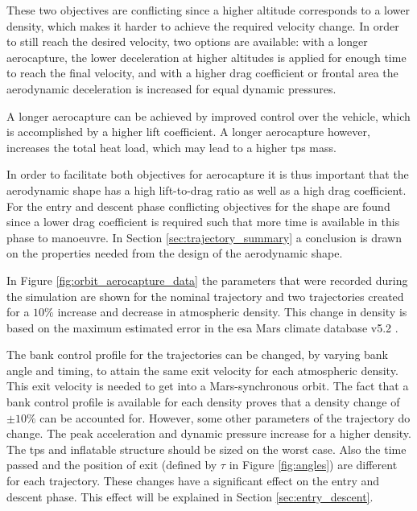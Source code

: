 These two objectives are conflicting since a higher altitude corresponds to a lower density, which makes it harder to achieve the required velocity change. In order to still reach the desired velocity, two options are available: with a longer aerocapture, the lower deceleration at higher altitudes is applied for enough time to reach the final velocity, and with a higher drag coefficient or frontal area the aerodynamic deceleration is increased for equal dynamic pressures.

A longer aerocapture can be achieved by improved control over the vehicle, which is accomplished by a higher lift coefficient. A longer aerocapture however, increases the total heat load, which may lead to a higher \gls{tps} mass.

In order to facilitate both objectives for aerocapture it is thus important that the aerodynamic shape has a high lift-to-drag ratio as well as a high drag coefficient. For the entry and descent phase conflicting objectives for the shape are found since a lower drag coefficient is required such that more time is available in this phase to manoeuvre. In Section \ref{sec:trajectory_summary} a conclusion is drawn on the properties needed from the design of the aerodynamic shape.

In Figure \ref{fig:orbit_aerocapture_data} the parameters that were recorded during the simulation are shown for the nominal trajectory and two trajectories created for a $10\%$ increase and decrease in atmospheric density. This change in density is based on the maximum estimated error in the \gls{esa} Mars climate database v5.2 \cite{Lewis2015}.

The bank control profile for the trajectories can be changed, by varying bank angle and timing, to attain the same exit velocity for each atmospheric density. This exit velocity is needed to get into a Mars-synchronous orbit. The fact that a bank control profile is available for each density proves that a density change of $\pm 10\%$ can be accounted for. However, some other parameters of the trajectory do change. The peak acceleration and dynamic pressure increase for a higher density. The \gls{tps} and inflatable structure should be sized on the worst case. Also the time passed and the position of exit (defined by $\tau$ in Figure \ref{fig:angles}) are different for each trajectory. These changes have a significant effect on the entry and descent phase. This effect will be explained in Section \ref{sec:entry_descent}.

